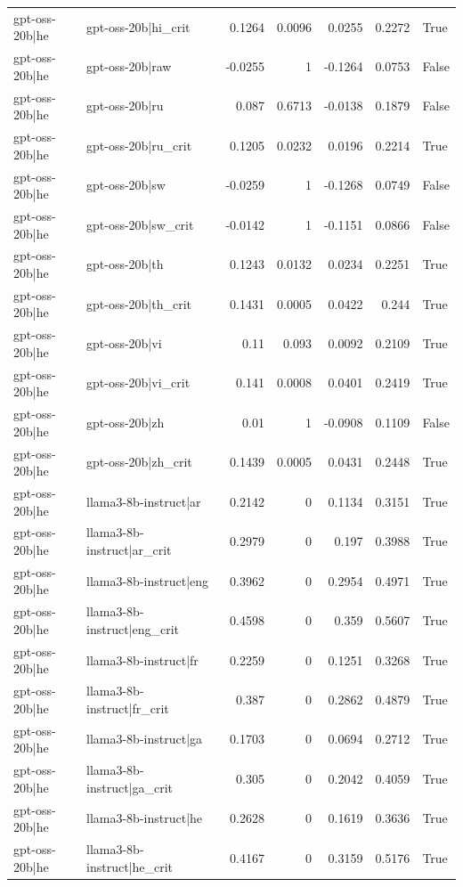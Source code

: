 \begin{table}
\begin{tabular}{l l r r r r l}
gpt-oss-20b|he & gpt-oss-20b|hi_crit & 0.1264 & 0.0096 & 0.0255 & 0.2272 & True \\
gpt-oss-20b|he & gpt-oss-20b|raw & -0.0255 & 1 & -0.1264 & 0.0753 & False \\
gpt-oss-20b|he & gpt-oss-20b|ru & 0.087 & 0.6713 & -0.0138 & 0.1879 & False \\
gpt-oss-20b|he & gpt-oss-20b|ru_crit & 0.1205 & 0.0232 & 0.0196 & 0.2214 & True \\
gpt-oss-20b|he & gpt-oss-20b|sw & -0.0259 & 1 & -0.1268 & 0.0749 & False \\
gpt-oss-20b|he & gpt-oss-20b|sw_crit & -0.0142 & 1 & -0.1151 & 0.0866 & False \\
gpt-oss-20b|he & gpt-oss-20b|th & 0.1243 & 0.0132 & 0.0234 & 0.2251 & True \\
gpt-oss-20b|he & gpt-oss-20b|th_crit & 0.1431 & 0.0005 & 0.0422 & 0.244 & True \\
gpt-oss-20b|he & gpt-oss-20b|vi & 0.11 & 0.093 & 0.0092 & 0.2109 & True \\
gpt-oss-20b|he & gpt-oss-20b|vi_crit & 0.141 & 0.0008 & 0.0401 & 0.2419 & True \\
gpt-oss-20b|he & gpt-oss-20b|zh & 0.01 & 1 & -0.0908 & 0.1109 & False \\
gpt-oss-20b|he & gpt-oss-20b|zh_crit & 0.1439 & 0.0005 & 0.0431 & 0.2448 & True \\
gpt-oss-20b|he & llama3-8b-instruct|ar & 0.2142 & 0 & 0.1134 & 0.3151 & True \\
gpt-oss-20b|he & llama3-8b-instruct|ar_crit & 0.2979 & 0 & 0.197 & 0.3988 & True \\
gpt-oss-20b|he & llama3-8b-instruct|eng & 0.3962 & 0 & 0.2954 & 0.4971 & True \\
gpt-oss-20b|he & llama3-8b-instruct|eng_crit & 0.4598 & 0 & 0.359 & 0.5607 & True \\
gpt-oss-20b|he & llama3-8b-instruct|fr & 0.2259 & 0 & 0.1251 & 0.3268 & True \\
gpt-oss-20b|he & llama3-8b-instruct|fr_crit & 0.387 & 0 & 0.2862 & 0.4879 & True \\
gpt-oss-20b|he & llama3-8b-instruct|ga & 0.1703 & 0 & 0.0694 & 0.2712 & True \\
gpt-oss-20b|he & llama3-8b-instruct|ga_crit & 0.305 & 0 & 0.2042 & 0.4059 & True \\
gpt-oss-20b|he & llama3-8b-instruct|he & 0.2628 & 0 & 0.1619 & 0.3636 & True \\
gpt-oss-20b|he & llama3-8b-instruct|he_crit & 0.4167 & 0 & 0.3159 & 0.5176 & True \\

\end{tabular}
\end{table}

